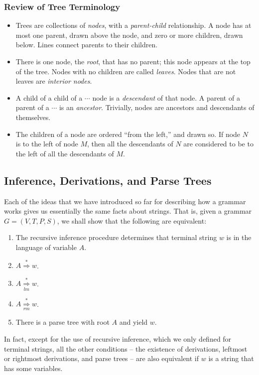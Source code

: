 \documentclass[]{article}
\begin{document}
    \subsubsection*{Review of Tree Terminology}
      \begin{itemize}
        \item Trees are collections of \emph{nodes}, with a \emph{parent-child}
        relationship. A node has at most one parent, drawn above the node, and
        zero or more children, drawn below. Lines connect parents to their
        children.
        \item There is one node, the \emph{root}, that has no parent; this node
        appears at the top of the tree. Nodes with no children are called
        \emph{leaves}. Nodes that are not leaves are \emph{interior nodes}.
        \item A child of a child of a $\cdots$ node is a \emph{descendant} of
        that node. A parent of a parent of a $\cdots$ is an \emph{ancestor}.
        Trivially, nodes are ancestors and descendants of themselves.
        \item The children of a node are ordered ``from the left,'' and drawn
        so. If node $N$ is to the left of node $M$, then all the descendants of
        $N$ are considered to be to the left of all the descendants of $M$.
      \end{itemize}
  \subsection*{Inference, Derivations, and Parse Trees}
    Each of the ideas that we have introduced so far for describing how a
    grammar works gives us essentially the same facts about strings. That is,
    given a grammar $G = (V,T,P,S)$, we shall show that the following are
    equivalent:
      \begin{enumerate}
        \item The recursive inference procedure determines that terminal string
        $w$ is in the language of variable $A$.
        \item $A \overset{*}{\Rightarrow} w$.
        \item $A \overset{*}{\underset{lm}{\Rightarrow}} w$.
        \item $A \overset{*}{\underset{rm}{\Rightarrow}} w$.
        \item There is a parse tree with root $A$ and yield $w$.
      \end{enumerate}
    In fact, except for the use of recursive inference, which we only defined
    for terminal strings, all the other conditions -- the existence of
    derivations, leftmost or rightmost derivations, and parse trees -- are also
    equivalent if $w$ is a string that has some variables.
\end{document}

